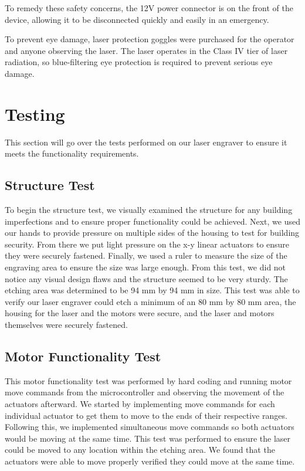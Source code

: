 \documentclass[11pt]{LaTeX-Classes/math-hw}
\begin{document}
To remedy these safety concerns, the 12V power connector is on the front of the device, allowing
it to be disconnected quickly and easily in an emergency.

To prevent eye damage, laser protection goggles were purchased for the operator
and anyone observing the laser.
The laser operates in the Class IV tier of laser radiation,
so blue-filtering eye protection is required to prevent serious eye damage.

\section{Testing}
This section will go over the tests performed on our laser engraver to ensure it meets the functionality requirements. 

\subsection{Structure Test}
To begin the structure test, we visually examined the structure for any building imperfections and to ensure proper functionality could be achieved. Next, we used our hands to provide pressure on multiple sides of the housing to test for building security. From there we put light pressure on the x-y linear actuators to ensure they were securely fastened. Finally, we used a ruler to measure the size of the engraving area to ensure the size was large enough. From this test, we did not notice any visual design flaws and the structure seemed to be very sturdy. The etching area was determined to be 94 mm by 94 mm in size. This test was able to verify our laser engraver could etch a minimum of an 80 mm by 80 mm area, the housing for the laser and the motors were secure, and the laser and motors themselves were securely fastened.

\subsection{Motor Functionality Test}
This motor functionality test was performed by hard coding and running motor move commands from the microcontroller and observing the movement of the actuators afterward. We started by implementing move commands for each individual actuator to get them to move to the ends of their respective ranges. Following this, we implemented simultaneous move commands so both actuators would be moving at the same time. This test was performed to ensure the laser could be moved to any location within the etching area. We found that the actuators were able to move properly verified they could move at the same time. 
\end{document}

